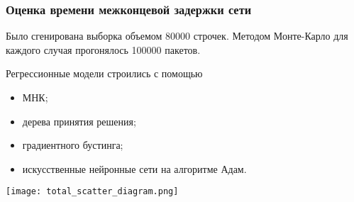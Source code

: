 \begin{frame}
    \justifying
    \frametitle{Оценка времени межконцевой задержки сети}
    \fontsize{8pt}{7.2}\selectfont

    Было сгенирована выборка объемом 80000 строчек. Методом Монте-Карло для каждого случая прогонялось 100000 пакетов. 
    \bigskip
    
    \begin{minipage}[c]{0.47\linewidth}
        

    Регрессионные модели строились с помощью
    \begin{itemize}
        \item МНК;
        \item дерева принятия решения;
        \item градиентного бустинга;
        \item искусственные нейронные сети на алгоритме Адам.
    \end{itemize}

    \end{minipage}
    \hfill
    \begin{minipage}[c]{0.5\linewidth}
        \texttt{[image: total\_scatter\_diagram.png]}
        \bigskip
        \bigskip

    \end{minipage}

\end{frame}
    
